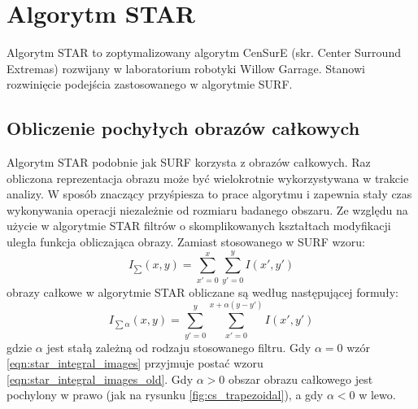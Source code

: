 \section{Algorytm STAR}
Algorytm STAR to zoptymalizowany algorytm {CenSurE} (skr. Center Surround Extremas) \cite{CENS} rozwijany w laboratorium robotyki Willow Garrage. Stanowi rozwinięcie podejścia zastosowanego w  algorytmie SURF. 


\subsection{Obliczenie pochyłych obrazów całkowych}

Algorytm STAR podobnie jak SURF korzysta z obrazów całkowych. Raz obliczona reprezentacja obrazu może być wielokrotnie wykorzystywana w trakcie analizy. W sposób znaczący przyśpiesza to prace algorytmu i zapewnia stały czas wykonywania operacji niezależnie od rozmiaru badanego obszaru. Ze względu na użycie w algorytmie STAR filtrów o skomplikowanych kształtach modyfikacji uległa funkcja obliczająca obrazy. Zamiast stosowanego w SURF wzoru:
\begin{equation}
I_{\sum}(x,y) = \sum\limits_{x'=0}^{ x} \sum\limits_{y'=0}^{y} I(x',y')
\label{eqn:star_integral_images_old}
\end{equation}
obrazy całkowe w algorytmie STAR obliczane są według następującej formuły:
\begin{equation}
I_{\sum\alpha}(x,y) = \sum\limits_{y'=0}^{ y} \sum\limits_{x'=0}^{x+\alpha(y-y')} I(x',y')
\label{eqn:star_integral_images}
\end{equation}
gdzie $\alpha$ jest stałą zależną od rodzaju stosowanego filtru. Gdy $\alpha=0$ wzór \ref{eqn:star_integral_images} przyjmuje postać wzoru \ref{eqn:star_integral_images_old}. Gdy $\alpha>0$ obszar obrazu całkowego jest pochylony w prawo (jak na rysunku \ref{fig:cs_trapezoidal}), a gdy $\alpha<0$ w lewo. 

